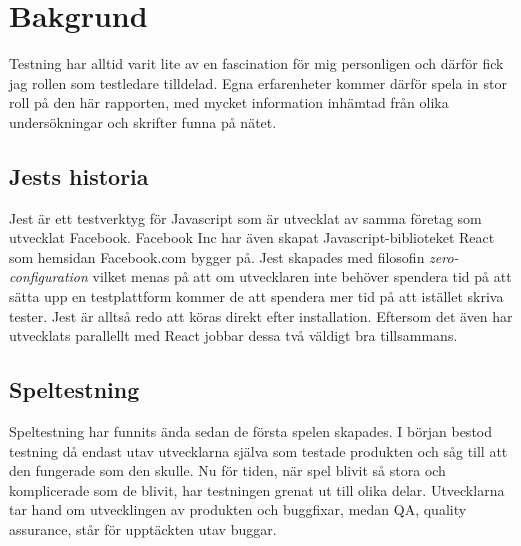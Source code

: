 \section{Bakgrund}
\label{sec:david-background}
Testning har alltid varit lite av en fascination för mig personligen och därför fick jag rollen som testledare tilldelad. Egna erfarenheter kommer därför spela in stor roll på den här rapporten, med mycket information inhämtad från olika undersökningar och skrifter funna på nätet.

\subsection{Jests historia}
Jest är ett testverktyg för Javascript som är utvecklat av samma företag som utvecklat Facebook. Facebook Inc har även skapat Javascript-biblioteket React\cite{bib-react} som hemsidan Facebook.com bygger på. Jest skapades med filosofin \textit{zero-configuration} vilket menas på att om utvecklaren inte behöver spendera tid på att sätta upp en testplattform kommer de att spendera mer tid på att istället skriva tester. Jest är alltså redo att köras direkt efter installation. Eftersom det även har utvecklats parallellt med React jobbar dessa två väldigt bra tillsammans.

\subsection{Speltestning}
Speltestning har funnits ända sedan de första spelen skapades. I början bestod testning då endast utav utvecklarna själva som testade produkten och såg till att den fungerade som den skulle. Nu för tiden, när spel blivit så stora och komplicerade som de blivit, har testningen grenat ut till olika delar. Utvecklarna tar hand om utvecklingen av produkten och buggfixar, medan QA, quality assurance, står för upptäckten utav buggar\cite{bib-quality-assured}. 